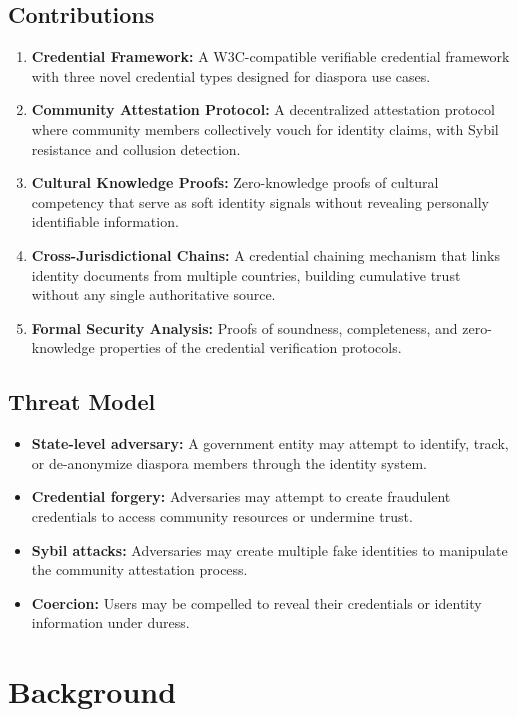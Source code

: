 \documentclass[11pt,a4paper]{article}
\begin{document}
\subsection{Contributions}

\begin{enumerate}[label=(\roman*)]
    \item \textbf{Credential Framework:} A W3C-compatible verifiable credential framework with three novel credential types designed for diaspora use cases.
    \item \textbf{Community Attestation Protocol:} A decentralized attestation protocol where community members collectively vouch for identity claims, with Sybil resistance and collusion detection.
    \item \textbf{Cultural Knowledge Proofs:} Zero-knowledge proofs of cultural competency that serve as soft identity signals without revealing personally identifiable information.
    \item \textbf{Cross-Jurisdictional Chains:} A credential chaining mechanism that links identity documents from multiple countries, building cumulative trust without any single authoritative source.
    \item \textbf{Formal Security Analysis:} Proofs of soundness, completeness, and zero-knowledge properties of the credential verification protocols.
\end{enumerate}

\subsection{Threat Model}

\begin{itemize}
    \item \textbf{State-level adversary:} A government entity may attempt to identify, track, or de-anonymize diaspora members through the identity system.
    \item \textbf{Credential forgery:} Adversaries may attempt to create fraudulent credentials to access community resources or undermine trust.
    \item \textbf{Sybil attacks:} Adversaries may create multiple fake identities to manipulate the community attestation process.
    \item \textbf{Coercion:} Users may be compelled to reveal their credentials or identity information under duress.
\end{itemize}

\section{Background}
\end{document}
